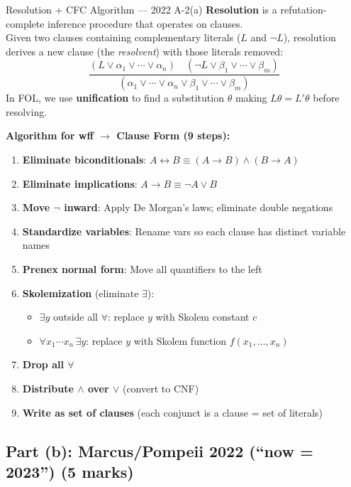 \documentclass[12pt,a4paper]{article}
\newcommand{\ra}{\rightarrow}
\newcommand{\lra}{\leftrightarrow}
\begin{document}
\begin{solbox}{Resolution + CFC Algorithm --- 2022 A-2(a)}
\textbf{Resolution} is a refutation-complete inference procedure that operates on clauses.\\
Given two clauses containing complementary literals ($L$ and $\neg L$), resolution derives a new clause (the \textit{resolvent}) with those literals removed:
\[\frac{(L \lor \alpha_1 \lor \cdots \lor \alpha_n)\quad(\neg L \lor \beta_1 \lor \cdots \lor \beta_m)}
       {(\alpha_1 \lor \cdots \lor \alpha_n \lor \beta_1 \lor \cdots \lor \beta_m)}\]
In FOL, we use \textbf{unification} to find a substitution $\theta$ making $L\theta = L'\theta$ before resolving.

\textbf{Algorithm for wff $\to$ Clause Form (9 steps):}
\begin{enumerate}[noitemsep,label=\textbf{Step \arabic*.}]
  \item \textbf{Eliminate biconditionals}: $A \lra B \equiv (A \ra B) \land (B \ra A)$
  \item \textbf{Eliminate implications}: $A \ra B \equiv \neg A \lor B$
  \item \textbf{Move $\neg$ inward}: Apply De Morgan's laws; eliminate double negations
  \item \textbf{Standardize variables}: Rename vars so each clause has distinct variable names
  \item \textbf{Prenex normal form}: Move all quantifiers to the left
  \item \textbf{Skolemization} (eliminate $\exists$):
    \begin{itemize}[noitemsep]
      \item $\exists y$ outside all $\forall$: replace $y$ with Skolem constant $c$
      \item $\forall x_1\cdots x_n\,\exists y$: replace $y$ with Skolem function $f(x_1,\ldots,x_n)$
    \end{itemize}
  \item \textbf{Drop all $\forall$}
  \item \textbf{Distribute $\land$ over $\lor$} (convert to CNF)
  \item \textbf{Write as set of clauses} (each conjunct is a clause = set of literals)
\end{enumerate}
\end{solbox}

\subsection{Part (b): Marcus/Pompeii 2022 (``now = 2023'') (5 marks)}
\end{document}
